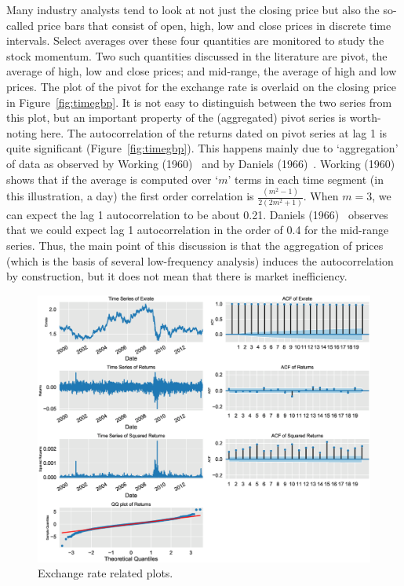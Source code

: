 Many industry analysts tend to look at not just the closing price but also the so-called price bars that consist of open, high, low and close prices in discrete time intervals. Select averages over these four quantities are monitored to study the stock momentum. Two such quantities discussed in the literature are pivot, the average of high, low and close prices; and mid-range, the average of high and low prices. The plot of the pivot for the exchange rate is overlaid on the closing price in Figure~\ref{fig:timegbp}. It is not easy to distinguish between the two series from this plot, but an important property of the (aggregated) pivot series is worth-noting here. The autocorrelation of the returns dated on pivot series at lag 1 is quite significant (Figure~\ref{fig:timegbp}). This happens mainly due to `aggregation' of data as observed by Working (1960)~\cite{working1960note} and by Daniels (1966)~\cite{daniels1966autocorrelation}. Working (1960)~\cite{working1960note} shows that if the average is computed over `$m$' terms in each time segment (in this illustration, a day) the first order correlation is $\frac{(m^2-1)}{2(2m^2+1)}$. When $m= 3$, we can expect the lag 1 autocorrelation to be about 0.21. Daniels (1966)~\cite{daniels1966autocorrelation} observes that we could expect lag 1 autocorrelation in the order of 0.4 for the mid-range series. Thus, the main point of this discussion is that the aggregation of prices (which is the basis of several low-frequency analysis) induces the autocorrelation by construction, but it does not mean that there is market inefficiency.
	\begin{figure}[!ht]
	\centering
	\includegraphics[width=\textwidth]{chapters/chapter_uvts/figures/31graphs.eps}
	\caption{Exchange rate related plots. \label{fig:exchrate}}
	\end{figure}

